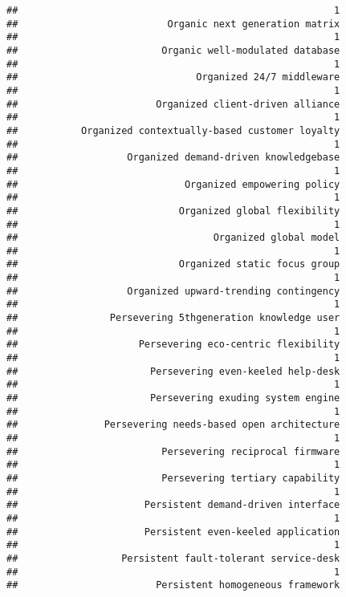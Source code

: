 \documentclass[
]{article}
\begin{document}
\begin{verbatim}
##                                                       1 
##                          Organic next generation matrix 
##                                                       1 
##                         Organic well-modulated database 
##                                                       1 
##                               Organized 24/7 middleware 
##                                                       1 
##                        Organized client-driven alliance 
##                                                       1 
##           Organized contextually-based customer loyalty 
##                                                       1 
##                   Organized demand-driven knowledgebase 
##                                                       1 
##                             Organized empowering policy 
##                                                       1 
##                            Organized global flexibility 
##                                                       1 
##                                  Organized global model 
##                                                       1 
##                            Organized static focus group 
##                                                       1 
##                   Organized upward-trending contingency 
##                                                       1 
##                Persevering 5thgeneration knowledge user 
##                                                       1 
##                     Persevering eco-centric flexibility 
##                                                       1 
##                       Persevering even-keeled help-desk 
##                                                       1 
##                       Persevering exuding system engine 
##                                                       1 
##               Persevering needs-based open architecture 
##                                                       1 
##                         Persevering reciprocal firmware 
##                                                       1 
##                         Persevering tertiary capability 
##                                                       1 
##                      Persistent demand-driven interface 
##                                                       1 
##                      Persistent even-keeled application 
##                                                       1 
##                  Persistent fault-tolerant service-desk 
##                                                       1 
##                        Persistent homogeneous framework 

\end{verbatim}
\end{document}
